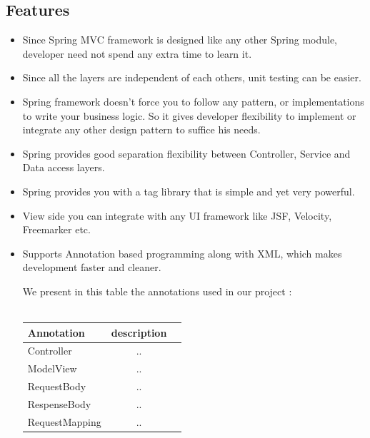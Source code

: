 \documentclass[12pt]{article}
\begin{document}
\subsection{Features}
\begin{itemize}
	\item Since Spring MVC framework is designed like any other Spring module, developer need not spend any extra time to learn it.
	\item Since all the layers are independent of each others, unit testing can be easier.
	\item Spring framework doesn’t force you to follow any pattern, or implementations to write your business logic. So it gives developer flexibility to implement or integrate any other design pattern to suffice his needs.
	\item Spring provides good separation flexibility between Controller, Service and Data access layers.
	\item Spring provides you with a tag library that is simple and yet very powerful.
	\item View side you can integrate with any UI framework like JSF, Velocity, Freemarker etc.
	\item Supports Annotation based programming along with XML, which makes development faster and cleaner.
	
	We present in this table the annotations used in our project :
	\\
	\\
	\begin{tabular}{|l|c|r|}
		\hline
		\textbf{Annotation} & \textbf{description }\\
		\hline
		Controller & .. \\
		ModelView & ..  \\
		RequestBody & .. \\
		RespenseBody & ..  \\	
	    RequestMapping & .. \\
		\hline
	\end{tabular}
	

\end{itemize} 
\end{document}
